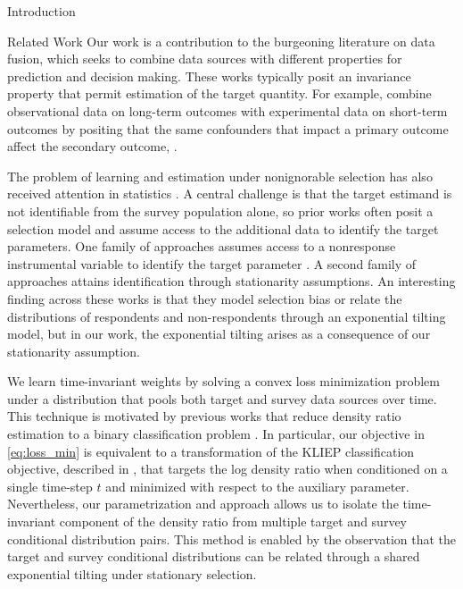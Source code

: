 \documentclass{article}
\theoremstyle{definition}
\theoremstyle{plain}
\theoremstyle{remark}
\begin{document}
\begin{section}{Introduction}
\begin{subsection}{Related Work}
Our work is a contribution to the burgeoning literature on data fusion, which seeks to combine data sources with different properties for prediction and decision making. These works typically posit an invariance property that permit estimation of the target quantity. For example, \citet{athey2025experimental} combine observational data on long-term outcomes with experimental data on short-term outcomes by positing that the same confounders that impact a primary outcome affect the secondary outcome, .

The problem of learning and estimation under nonignorable selection has also received attention in statistics \citep{franks2020nonstandard,kim2011semiparametric,uehara2023statistical}. A central challenge is that the target estimand is not identifiable from the survey population alone, so prior works often posit a selection model and assume access to the additional data to identify the target parameters. One family of approaches assumes access to a nonresponse instrumental variable to identify the target parameter \citep{kim2011semiparametric,uehara2023statistical}. A second family of approaches \citep{magder2003simple,miao2025stableness} attains identification through stationarity assumptions. An interesting finding across these works is that they model selection bias or relate the distributions of respondents and non-respondents through an exponential tilting model, but in our work, the exponential tilting arises as a consequence of our stationarity assumption. 


We learn time-invariant weights by solving a convex loss minimization problem under a distribution that pools both target and survey data sources over time. This technique is motivated by previous works that reduce density ratio estimation to a binary classification problem \citep{bickel2009discriminative,menon2016linking,sugiyama2008direct}. In particular, our objective in \eqref{eq:loss_min} is equivalent to a transformation of the KLIEP classification objective, described in \citet{menon2016linking}, that targets the log density ratio  when conditioned on a single time-step $t$ and minimized with respect to the auxiliary parameter. Nevertheless, our parametrization and approach allows us to isolate the time-invariant component of the density ratio from multiple target and survey conditional distribution pairs. This method is enabled by the observation that the target and survey conditional distributions can be related through a shared exponential tilting under stationary selection.


\end{subsection}
\end{section}
\end{document}
